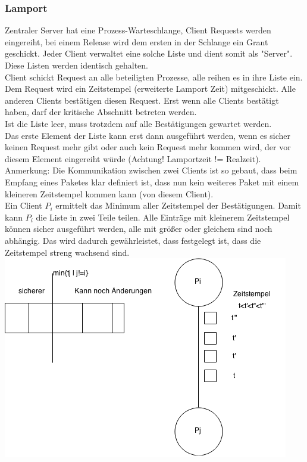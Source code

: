 \documentclass[a4paper]{article}
\begin{document}
\subsubsection{Lamport}
Zentraler Server hat eine Prozess-Warteschlange, Client Requests werden eingereiht, bei einem Release wird dem ersten in der Schlange ein Grant geschickt. Jeder Client verwaltet eine solche Liste und dient somit als "Server". Diese Listen werden identisch gehalten.\\
Client schickt Request an alle beteiligten Prozesse, alle reihen es in ihre Liste ein. Dem Request wird ein Zeitstempel (erweiterte Lamport Zeit) mitgeschickt. Alle anderen Clients bestätigen diesen Request. Erst wenn alle Clients bestätigt haben, darf der kritische Abschnitt betreten werden.\\
Ist die Liste leer, muss trotzdem auf alle Bestätigungen gewartet werden.\\
Das erste Element der Liste kann erst dann ausgeführt werden, wenn es sicher keinen Request mehr gibt oder auch kein Request mehr kommen wird, der vor diesem Element eingereiht würde (Achtung! Lamportzeit != Realzeit).\\
Anmerkung: Die Kommunikation zwischen zwei Clients ist so gebaut, dass beim Empfang eines Paketes klar definiert ist, dass nun kein weiteres Paket mit einem kleineren Zeitstempel kommen kann (von diesem Client).\\
Ein Client $P_i$ ermittelt das Minimum aller Zeitstempel der Bestätigungen. Damit kann $P_i$ die Liste in zwei Teile teilen. Alle Einträge mit kleinerem Zeitstempel können sicher ausgeführt werden, alle mit größer oder gleichem sind noch abhängig. Das wird dadurch gewährleistet, dass festgelegt ist, dass die Zeitstempel streng wachsend sind.\\
\includegraphics[scale=0.5]{lamport1.png}
\end{document}
